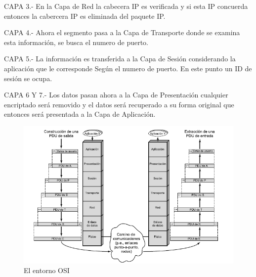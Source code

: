 CAPA 3.- En la Capa de Red la cabecera IP es verificada y si esta IP concuerda entonces la cabercera IP es eliminada del paquete IP.

CAPA 4.- Ahora el segmento pasa a la Capa de Transporte donde se examina esta informaci\'on, se busca el numero de puerto.

CAPA 5.- La informaci\'on es transferida a la Capa de Sesi\'on considerando la aplicaci\'on que le corresponde Seg\'un el numero de puerto. En este punto un ID de sesi\'on se ocupa.

CAPA 6 Y 7.- Los datos pasan ahora a la Capa de Presentaci\'on cualquier encriptado ser\'a removido y el datos ser\'a recuperado a su forma original que entonces ser\'a presentada a la Capa de Aplicaci\'on.
		\begin{figure}[h]
			\centering		
			\includegraphics[width=\textwidth]{EntornoOSI}
			\caption{El entorno OSI}
		\end{figure}
		\clearpage
